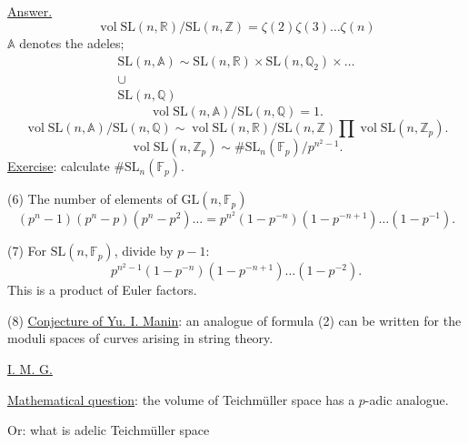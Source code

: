 \underline{Answer.}
\begin{equation}
 \operatorname{vol}\mathrm{SL}(n,\mathbb R)/\mathrm{SL}(n,\mathbb Z)
 =\zeta(2)\zeta(3)\ldots\zeta(n)
 \tag{2}
\end{equation}
$\mathbb A$ denotes the adeles;
\begin{equation}
 \begin{gathered}
 \mathrm{SL}(n,\mathbb A)\sim
 \mathrm{SL}(n,\mathbb R)\times\mathrm{SL}(n,\mathbb Q_2)\times\ldots\\
 \cup\\
 \mathrm{SL}(n,\mathbb Q)
 \end{gathered}
 \tag{3}
\end{equation}
\begin{equation}
 \operatorname{vol}\mathrm{SL}(n,\mathbb A)/\mathrm{SL}(n,\mathbb Q)=1.
 \tag{4}
\end{equation}
\begin{equation*}
 \operatorname{vol}\mathrm{SL}(n,\mathbb A)/\mathrm{SL}(n,\mathbb Q)
 \sim
 \operatorname{vol}\mathrm{SL}(n,\mathbb R)/\mathrm{SL}(n,\mathbb Z)
 \prod\operatorname{vol}\mathrm{SL}(n,\mathbb Z_p).
\end{equation*}
\begin{equation}
 \operatorname{vol}\mathrm{SL}(n,\mathbb Z_p)
 \sim\#\mathrm{SL}_n(\mathbb F_p)/p^{n^2-1}.
 \tag{5}
\end{equation}
\underline{Exercise}: calculate $\#\mathrm{SL}_n(\mathbb F_p)$.


(6) The number of elements of $\mathrm{GL}(n,\mathbb F_p)$
\begin{equation*}
 (p^n-1)(p^n-p)(p^n-p^2)\ldots
 =
 p^{n^2}(1-p^{-n})(1-p^{-n+1})\ldots(1-p^{-1}).
\end{equation*}

(7) For $\mathrm{SL}(n,\mathbb F_p)$, divide by $p-1$:
\begin{equation*}
 p^{n^2-1}(1-p^{-n})(1-p^{-n+1})\ldots(1-p^{-2}).
\end{equation*}
This is a product of Euler factors.

(8) \underline{Conjecture of Yu. I. Manin}: an analogue of formula (2) can be written for
the moduli spaces of curves arising in string theory.

\underline{I. M. G.}

\underline{Mathematical question}: the volume of Teichmüller space has a $p$-adic analogue.

Or: what is adelic Teichmüller space

